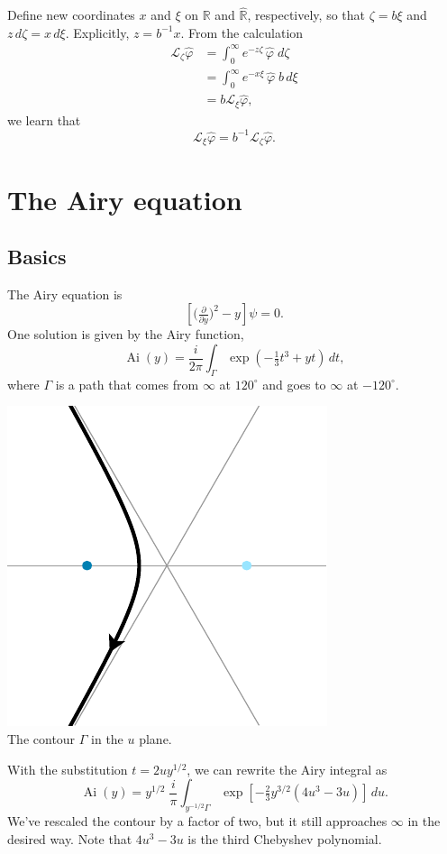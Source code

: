 \documentclass{article}
\newcommand{\R}{\mathbb{R}}
\newcommand{\laplace}{\mathcal{L}}
\DeclareMathOperator{\Ai}{Ai}
\begin{document}
Define new coordinates $x$ and $\xi$ on $\R$ and $\hat{\R}$, respectively, so that $\zeta = b\xi$ and $z\,d\zeta = x\,d\xi$. Explicitly, $z = b^{-1}x$. From the calculation
\begin{align*}
\laplace_\zeta \hat{\varphi} & = \int_0^\infty e^{-z \zeta}\,\hat{\varphi}\;d\zeta \\
& = \int_0^\infty e^{-x\xi}\,\hat{\varphi}\;b\,d\xi \\
& = b \laplace_\xi \hat{\varphi},
\end{align*}
we learn that
\[ \laplace_\xi \hat{\varphi} = b^{-1} \laplace_\zeta \hat{\varphi}. \]
\section{The Airy equation}
\subsection{Basics}
The Airy equation is
\begin{equation}\label{eqn:airy}
\left[\big(\tfrac{\partial}{\partial y}\big)^2 - y\right] \psi = 0.
\end{equation}
One solution is given by the Airy function,
\[ \Ai(y) = \frac{i}{2\pi} \int_{\Gamma} \exp\left(-\tfrac{1}{3}t^3 + yt\right)\,dt, \]
where $\Gamma$ is a path that comes from $\infty$ at $120^\circ$ and goes to $\infty$ at $-120^\circ$.
\begin{center}
\includegraphics{figures/u_contour_3.pdf} \\[1em]
{\small The contour $\Gamma$ in the $u$ plane.}
\end{center}
With the substitution $t = 2uy^{1/2}$, we can rewrite the Airy integral as
\[ \Ai(y) = y^{1/2}\;\frac{i}{\pi} \int_{y^{-1/2} \Gamma} \exp\left[-\tfrac{2}{3}y^{3/2} \left(4u^3 - 3u\right)\right]\,du. \]
We've rescaled the contour by a factor of two, but it still approaches $\infty$ in the desired way. Note that $4u^3 - 3u$ is the third Chebyshev polynomial.
\end{document}
